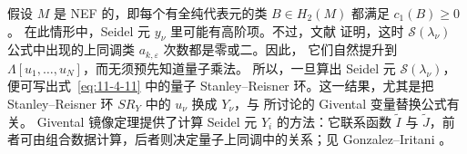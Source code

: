 \begin{example}\label{ex:11-4-11}
假设 $M$ 是 NEF 的，即每个有全纯代表元的类 $B\in H_2(M)$ 都满足 $c_1(B)\ge0$。
在此情形中，Seidel 元 $y_\nu$ 里可能有高阶项。不过，文献  证明，这时
$\mathcal S(\lambda_\nu)$ 公式中出现的上同调类 $a_{k,\varepsilon}$ 次数都是零或二。因此，
它们自然提升到
$\Lambda[u_1,\ldots,u_N]$，而无须预先知道量子乘法。
所以，一旦算出 Seidel 元 $\mathcal S(\lambda_\nu)$，便可写出式~\eqref{eq:11-4-11}
中的量子 Stanley--Reisner 环。这一结果，尤其是把 Stanley--Reisner 环 $SR_Y$ 中的
$u_\nu$ 换成 $Y_\nu$，与  所讨论的 Givental 变量替换公式有关。
Givental 镜像定理提供了计算 Seidel 元 $Y_i$ 的方法：它联系函数 $\widetilde I$ 与
$\widetilde J$，前者可由组合数据计算，后者则决定量子上同调中的关系；见
Gonzalez--Iritani 。
\end{example}
